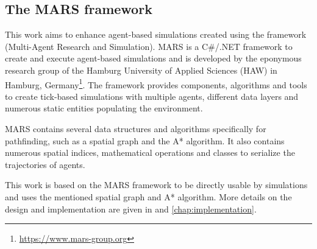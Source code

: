 	\subsection{The MARS framework}
	
		This work aims to enhance agent-based simulations created using the framework  (Multi-Agent Research and Simulation).
		MARS is a C\#/.NET framework to create and execute agent-based simulations and is developed by the eponymous research group of the Hamburg University of Applied Sciences (HAW) in Hamburg, Germany\footnote{\url{https://www.mars-group.org}}.
		The framework provides components, algorithms and tools to create tick-based simulations with multiple agents, different data layers and numerous static entities populating the environment.
		
		MARS contains several data structures and algorithms specifically for pathfinding, such as a spatial graph and the A* algorithm.
		It also contains numerous spatial indices, mathematical operations and classes to serialize the trajectories of agents.
		 
		This work is based on the MARS framework to be directly usable by simulations and uses the mentioned spatial graph and A* algorithm.
		More details on the design and implementation are given in  and \ref{chap:implementation}.